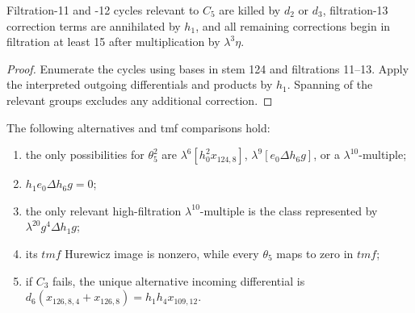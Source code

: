 \begin{proposition}
  \label{evidence:near126-indeterminacy}
  \notready
  Filtration-11 and -12 cycles relevant
  to $C_5$ are killed by $d_2$ or $d_3$, filtration-13 correction terms are
  annihilated by $h_1$, and all remaining corrections begin in filtration at
  least 15 after multiplication by $\lambda^3\eta$.
\end{proposition}

\begin{proof}
  Enumerate the cycles using bases in stem 124 and filtrations 11--13.
  Apply the interpreted outgoing differentials and products by $h_1$.
  Spanning of the relevant groups excludes any additional correction.
\end{proof}

\begin{proposition}
  \label{evidence:theta5-square-tmf}
  \notready
  The following alternatives and tmf comparisons hold:
  \begin{enumerate}
    \item the only possibilities for $\theta_5^2$ are
      $\lambda^6[h_0^2x_{124,8}]$,
      $\lambda^9[e_0\Delta h_6g]$, or a $\lambda^{10}$-multiple;
    \item $h_1e_0\Delta h_6g=0$;
    \item the only relevant high-filtration $\lambda^{10}$-multiple is the
      class represented by $\lambda^{20}g^4\Delta h_1g$;
    \item its $tmf$ Hurewicz image is nonzero, while every $\theta_5$ maps to
      zero in $tmf$;
    \item if $C_3$ fails, the unique alternative incoming differential is
      $d_6(x_{126,8,4}+x_{126,8})=h_1h_4x_{109,12}$.
  \end{enumerate}
\end{proposition}


